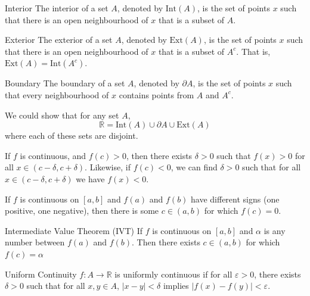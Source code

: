 \documentclass[12pt]{article}
\begin{document}
\begin{definition}{Interior}{}
    The interior of a set $ A $, denoted by $ \mathrm{Int} \left( A \right) $, is the set of points $ x $ such that there is an open neighbourhood of $ x $ that is a subset of $ A $.
\end{definition}
\begin{definition}{Exterior}{}
    The exterior of a set $ A $, denoted by $ \mathrm{Ext} \left( A \right) $, is the set of points $ x $ such that there is an open neighbourhood of $ x $ that is a subset of $ A^c $. That is, $ \mathrm{Ext} \left( A \right) = \mathrm{Int} \left( A^c \right) $.
\end{definition}
\begin{definition}{Boundary}{}
    The boundary of a set $ A $, denoted by $ \partial A $, is the set of points $ x $ such that every neighbourhood of $ x $ contains points from $ A $ and $ A^c $.
\end{definition}
\begin{note}{}{}
    We could show that for any set $ A $,
    \[ \mathbb{R} = \mathrm{Int} \left( A \right) \cup \partial A \cup \mathrm{Ext} \left( A \right) \]
    where each of these sets are disjoint.
\end{note}
\begin{lemma}{}{}
    If $ f $ is continuous, and $ f \left( c \right) > 0 $, then there exists $ \delta > 0 $ such that $ f \left( x \right) > 0 $ for all $ x \in \left( c - \delta, c + \delta \right) $.
    \medskip
    \newline
    Likewise, if $ f \left( c \right) < 0 $, we can find $ \delta > 0 $ such that for all $ x \in \left( c - \delta, c + \delta \right) $ we have $ f \left( x \right) < 0 $.
\end{lemma}
\begin{proposition}{}{}
    If $ f $ is continuous on $ \left[ a, b \right] $ and $ f \left( a \right) $ and $ f \left( b \right) $ have different signs (one positive, one negative), then there is some $ c \in \left( a, b \right) $ for which $ f \left( c \right) = 0 $.
\end{proposition}
\begin{theorem}{Intermediate Value Theorem (IVT)}{}
    If $ f $ is continuous on $ \left[ a, b \right] $ and $ \alpha $ is any number between $ f \left( a \right) $ and $ f \left( b \right) $. Then there exists $ c \in \left( a, b \right) $ for which $ f \left( c \right) = \alpha $
\end{theorem}
\begin{definition}{Uniform Continuity}{}
    $ f : A \to \mathbb{R} $ is uniformly continuous if for all $ \varepsilon > 0 $, there exists $ \delta > 0 $ such that for all $ x, y \in A $, $ | x - y | < \delta $ implies $ | f \left( x \right) - f \left( y \right) | < \varepsilon $.
\end{definition}
\end{document}
